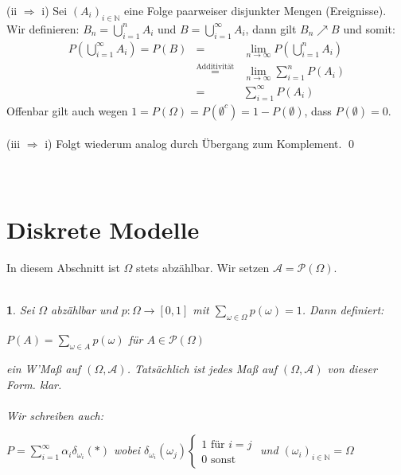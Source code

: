 \documentclass[10pt,a4paper]{report}
\numberwithin{equation}{section}
\numberwithin{figure}{section}
\theoremstyle{plain}
\theoremstyle{definition}
\theoremstyle{plain}
\newtheorem{prop}{\protect\propositionname}[section]
\theoremstyle{definition}
\theoremstyle{remark}
\theoremstyle{plain}
\theoremstyle{plain}
\theoremstyle{plain}
\theoremstyle{plain}
\theoremstyle{plain}
\providecommand{\propositionname}{Satz}
\newcommand{\1}{ \mathbb{1} } %
\begin{document}
(ii $\Rightarrow$ i) Sei $(A_i)_{i\in \mathbb{N}}$ eine Folge paarweiser disjunkter Mengen (Ereignisse). Wir definieren: $B_n=\bigcup\limits_{i=1}^n A_i$ und $B=\bigcup\limits_{i=1}^\infty A_i$, dann gilt $B_n \nearrow B$ und somit:
\begin{eqnarray*}
P\left(\bigcup\limits_{i=1}^\infty A_i\right)=P(B)&=&\lim\limits_{n \to \infty}P\left(\bigcup\limits_{i=1}^n A_i\right)\\
&\overset{\text{Additivität}}{=}& \lim\limits_{n \to \infty}\sum\limits_{i=1}^n P(A_i)\\
&=& \sum\limits_{i=1}^\infty P(A_i)
\end{eqnarray*} 
Offenbar gilt auch wegen $1=P(\Omega)=P(\emptyset^c)=1-P(\emptyset)$, dass $P(\emptyset)=0$.\\\\
(iii $\Rightarrow$ i) Folgt wiederum analog durch Übergang zum Komplement. \qed\\\\\\

\section{Diskrete Modelle}
\label{sec:diskrete-modelle}

In diesem Abschnitt ist $\Omega$ stets abzählbar. Wir setzen $\mathcal{A}=\mathcal{P}(\Omega)$.\\\\
\begin{prop}
  Sei $\Omega$ abzählbar und $p: \Omega \to [0,1]$ mit
  $\sum\limits_{\omega \in \Omega}p(\omega)=1$. Dann definiert:
  \begin{center}
    $P(A)=\sum\limits_{\omega \in A} p(\omega)$ für $A\in
    \mathcal{P}(\Omega)$
  \end{center}
  ein W'Maß auf $(\Omega,\mathcal{A})$. Tatsächlich ist jedes Maß auf
  $(\Omega,\mathcal{A})$ von dieser Form.
  \proof klar.\\\\
  Wir schreiben auch:
  \begin{center}
    $P=\sum\limits_{i=1}^\infty \alpha_i\delta_{\omega_i}(*)$ wobei
    $\delta_{\omega_i}(\omega_j)
    \begin{cases}
      1 \text{ für } i=j\\
      0 \text{ sonst}
    \end{cases}$ und $(\omega_i)_{i \in \mathbb{N}}=\Omega$
  \end{center}
\end{prop}
\end{document}
